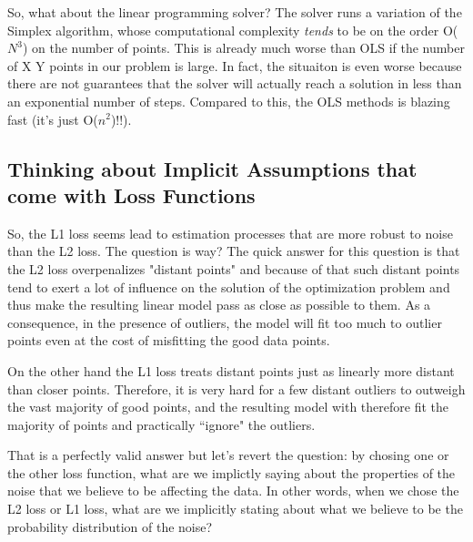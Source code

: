 So, what about the linear programming solver? The solver runs a variation of the Simplex algorithm, whose computational complexity \emph{tends} to be on the order O($N^3$) on the number of points. This is already much worse than OLS if the number of X Y points in our problem is large. In fact, the situaiton is even worse because there are not guarantees that the solver will actually reach a solution in less than an exponential number of steps. Compared to this, the OLS methods is blazing fast (it's just O($n^2$)!!).

\subsection{Thinking about Implicit Assumptions that come with Loss Functions}
So, the L1 loss seems lead to estimation processes that are more robust to noise than the L2 loss. The question is way? The quick answer for this question is that the L2 loss overpenalizes "distant points" and because of that such distant points tend to exert a lot of influence on the solution of the optimization problem and thus make the resulting linear model pass as close as possible to them. As a consequence, in the presence of outliers, the model will fit too much to outlier points even at the cost of misfitting the good data points. 

On the other hand the L1 loss treats distant points just as linearly more distant than closer points. Therefore, it is very hard for a few distant outliers to outweigh the vast majority of good points, and the resulting model with therefore fit the majority of points and practically ``ignore" the outliers.

That is a perfectly valid answer but let's revert the question: by chosing one or the other loss function, what are we implictly saying about the properties of the noise that we believe to be affecting the data. In other words, when we chose the L2 loss or L1 loss, what are we implicitly stating about what we believe to be the probability distribution of the noise?


